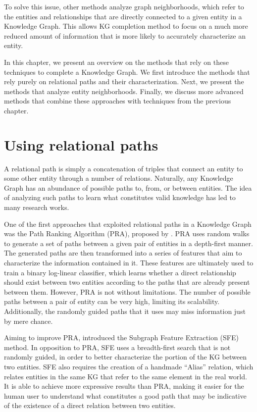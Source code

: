 To solve this issue, other methods analyze graph neighborhoods, which refer to the entities and relationships that are directly connected to a given entity in a Knowledge Graph. This allows KG completion method to focus on a much more reduced amount of information that is more likely to accurately characterize an entity.

In this chapter, we present an overview on the methods that rely on these techniques to complete a Knowledge Graph. We first introduce the methods that rely purely on relational paths and their characterization. Next, we present the methods that analyze entity neighborhoods. Finally, we discuss more advanced methods that combine these approaches with techniques from the previous chapter.

\section{Using relational paths}\label{sec:path-relational}
A relational path is simply a concatenation of triples that connect an entity to some other entity through a number of relations. Naturally, any Knowledge Graph has an abundance of possible paths to, from, or between entities. The idea of analyzing such paths to learn what constitutes valid knowledge has led to many research works.

One of the first approaches that exploited relational paths in a Knowledge Graph was the Path Ranking Algorithm (PRA), proposed by \citet{lao2011}. PRA uses random walks to generate a set of paths between a given pair of entities in a depth-first manner. The generated paths are then transformed into a series of features that aim to characterize the information contained in it. These features are ultimately used to train a binary log-linear classifier, which learns whether a direct relationship should exist between two entities according to the paths that are already present between them. However, PRA is not without limitations. The number of possible paths between a pair of entity can be very high, limiting its scalability. Additionally, the randomly guided paths that it uses may miss information just by mere chance.

Aiming to improve PRA, \citet{gardner2015} introduced the Subgraph Feature Extraction (SFE) method. In opposition to PRA, SFE uses a breadth-first search that is not randomly guided, in order to better characterize the portion of the KG between two entities. SFE also requires the creation of a handmade ``Alias'' relation, which relates entities in the same KG that refer to the same element in the real world. It is able to achieve more expressive results than PRA, making it easier for the human user to understand what constitutes a good path that may be indicative of the existence of a direct relation between two entities.

